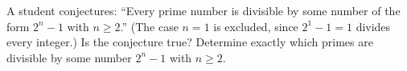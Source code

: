 A student conjectures: ``Every prime number is divisible by some number of the form $2^n-1$ with $n\ge2$.'' (The case $n=1$ is excluded, since $2^1-1=1$ divides every integer.) Is the conjecture true? Determine exactly which primes are divisible by some number $2^n-1$ with $n\ge2$.
